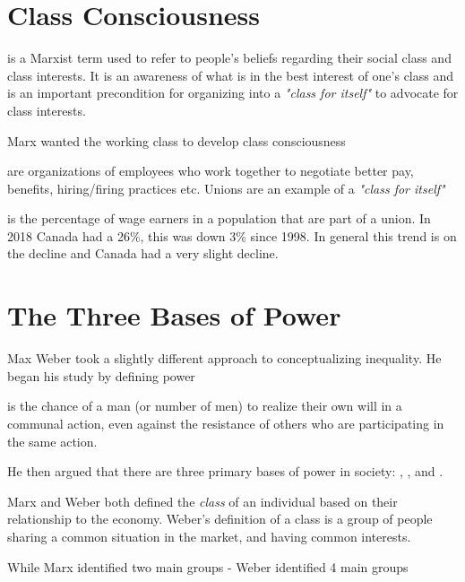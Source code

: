 \section{Class Consciousness}
 is a Marxist term used to refer to people's beliefs regarding their social class and class interests. It is an awareness of what is in the best interest of one's class and is an important precondition for organizing into a \textit{"class for itself"} to advocate for class interests.
\begin{bullets}
	\item Marx wanted the working class to develop class consciousness
	\item {} are organizations of employees who work together to negotiate better pay, benefits, hiring/firing practices etc. Unions are an example of a \textit{"class for itself"}
	\item {} is the percentage of wage earners in a population that are part of a union. In 2018 Canada had a 26\%, this was down 3\% since 1998. In general this trend is on the decline and Canada had a very slight decline.
\end{bullets}

\section{The Three Bases of Power}
 
Max Weber took a slightly different approach to conceptualizing inequality. He began his study by defining power
\begin{bullets}
	\item {} is the chance of a man (or number of men) to realize their own will in a communal action, even against the resistance of others who are participating in the same action.
\end{bullets}

He then argued that there are three primary bases of power in society: , , and .
\begin{bullets}
	\item  Marx and Weber both defined the \textit{class} of an individual based on their relationship to the economy. Weber's definition of a class is a group of people sharing a common situation in the market, and having common interests.
	\item While Marx identified two main groups - Weber identified 4 main groups
\end{bullets}


